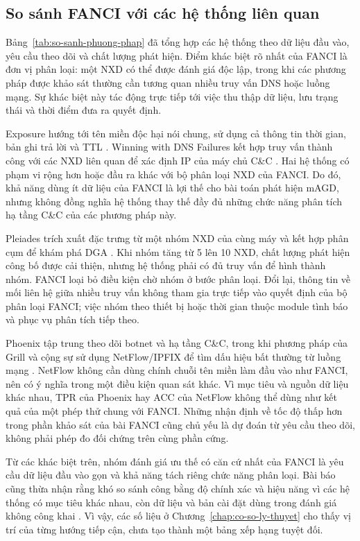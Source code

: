 \subsection{So sánh FANCI với các hệ thống liên quan}\label{sec:fanci-vs-khac}

Bảng~\ref{tab:so-sanh-phuong-phap} đã tổng hợp các hệ thống theo dữ liệu đầu vào, yêu cầu theo dõi và chất lượng phát hiện. Điểm khác biệt rõ nhất của FANCI là đơn vị phân loại: một NXD có thể được đánh giá độc lập, trong khi các phương pháp được khảo sát thường cần tương quan nhiều truy vấn DNS hoặc luồng mạng. Sự khác biệt này tác động trực tiếp tới việc thu thập dữ liệu, lưu trạng thái và thời điểm đưa ra quyết định.

Exposure hướng tới tên miền độc hại nói chung, sử dụng cả thông tin thời gian, bản ghi trả lời và TTL \cite{bilge2014exposure}. Winning with DNS Failures kết hợp truy vấn thành công với các NXD liên quan để xác định IP của máy chủ C\&C \cite{yadav2011winning}. Hai hệ thống có phạm vi rộng hơn hoặc đầu ra khác với bộ phân loại NXD của FANCI. Do đó, khả năng dùng ít dữ liệu của FANCI là lợi thế cho bài toán phát hiện mAGD, nhưng không đồng nghĩa hệ thống thay thế đầy đủ những chức năng phân tích hạ tầng C\&C của các phương pháp này.

Pleiades trích xuất đặc trưng từ một nhóm NXD của cùng máy và kết hợp phân cụm để khám phá DGA \cite{antonakakis2012throwaway}. Khi nhóm tăng từ 5 lên 10 NXD, chất lượng phát hiện công bố được cải thiện, nhưng hệ thống phải có đủ truy vấn để hình thành nhóm. FANCI loại bỏ điều kiện chờ nhóm ở bước phân loại. Đổi lại, thông tin về mối liên hệ giữa nhiều truy vấn không tham gia trực tiếp vào quyết định của bộ phân loại FANCI; việc nhóm theo thiết bị hoặc thời gian thuộc module tình báo và phục vụ phân tích tiếp theo.

Phoenix tập trung theo dõi botnet và hạ tầng C\&C, trong khi phương pháp của Grill và cộng sự sử dụng NetFlow/IPFIX để tìm dấu hiệu bất thường từ luồng mạng \cite{schiavoni2014phoenix,grill2015netflow}. NetFlow không cần dùng chính chuỗi tên miền làm đầu vào như FANCI, nên có ý nghĩa trong một điều kiện quan sát khác. Vì mục tiêu và nguồn dữ liệu khác nhau, TPR của Phoenix hay ACC của NetFlow không thể dùng như kết quả của một phép thử chung với FANCI. Những nhận định về tốc độ thấp hơn trong phần khảo sát của bài FANCI cũng chủ yếu là dự đoán từ yêu cầu theo dõi, không phải phép đo đối chứng trên cùng phần cứng.

Từ các khác biệt trên, nhóm đánh giá ưu thế có căn cứ nhất của FANCI là yêu cầu dữ liệu đầu vào gọn và khả năng tách riêng chức năng phân loại. Bài báo cũng thừa nhận rằng khó so sánh công bằng độ chính xác và hiệu năng vì các hệ thống có mục tiêu khác nhau, còn dữ liệu và bản cài đặt dùng trong đánh giá không công khai \cite{schuppen2018fanci}. Vì vậy, các số liệu ở Chương~\ref{chap:co-so-ly-thuyet} cho thấy vị trí của từng hướng tiếp cận, chưa tạo thành một bảng xếp hạng tuyệt đối.

